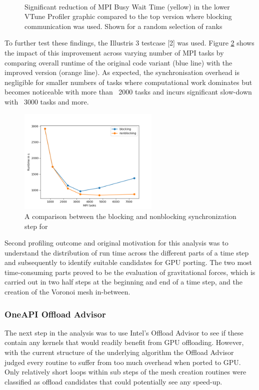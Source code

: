 \documentclass[../main]{subfiles}
\begin{document}
\begin{figure}[htp]
	\centering
	\\
	\caption{Significant reduction of MPI Busy Wait Time (yellow) in the lower VTune Profiler graphic compared to the top version where blocking communication was used. Shown for a random selection of ranks}
	\label{fig:arepo_mpicom} %
\end{figure}
To further test these findings, the Illustris 3 testcase [2] was used. Figure \ref{fig:arepo_blockvsnonblock} shows the impact of this improvement across varying number of MPI tasks by comparing overall runtime of the original code variant (blue line) with the improved version (orange line). As expected, the synchronisation overhead is negligible for smaller numbers of tasks where computational work dominates but becomes noticeable with more than ~2000 tasks and incurs significant slow-down with ~3000 tasks and more.  
\begin{figure}[htp]
	\centering
	\includegraphics[clip,width=0.6\textwidth]{images/Arepo_blockingvsNonblocking.png}
	\caption{A comparison between the blocking and nonblocking synchronization step for }
	\label{fig:arepo_blockvsnonblock} %
\end{figure}
Second profiling outcome and original motivation for this analysis was to understand the distribution of run time across the different parts of a time step and subsequently to identify suitable candidates for GPU porting.
The two most time-consuming parts proved to be the evaluation of gravitational forces, which is carried out in two half steps at the beginning and end of a time step, and the creation of the Voronoi mesh in-between.

 \subsubsection{OneAPI Offload Advisor}
The next step in the analysis was to use Intel's Offload Advisor to see if these contain any kernels that would readily benefit from GPU offloading.
However, with the current structure of the underlying algorithm the Offload Advisor judged every routine to suffer from too much overhead when ported to GPU.
Only relatively short loops within sub steps of the mesh creation routines were classified as offload candidates that could potentially see any speed-up.
\end{document}
